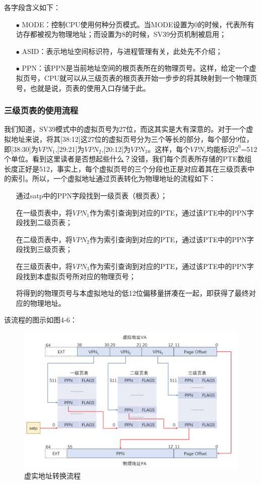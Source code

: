 各字段含义如下：

\begin{itemize}
	\item [$\bullet$]
	MODE：控制CPU使用何种分页模式。当MODE设置为0的时候，代表所有访存都被视为物理地址；而设置为8的时候，SV39分页机制被启用；
	\item [$\bullet$]
	ASID：表示地址空间标识符，与进程管理有关，此处先不介绍；
	\item [$\bullet$]
	PPN：该PPN是当前地址空间的根页表所在的物理页号。这样，给定一个虚拟页号，CPU就可以从三级页表的根页表开始一步步的将其映射到一个物理页号，也就是说，页表的使用入口存储于此。
\end{itemize}

\subsubsection{三级页表的使用流程}

我们知道，SV39模式中的虚拟页号为27位，而这其实是大有深意的。对于一个虚拟地址来说，将其[38:12]这27位的虚拟页号分为三个等长的部分，每个部分9位，即[38:30]为$VPN_{1}$,[29:21]为$VPN_{2}$,[20:12]为$VPN_{3}$。这样，每个$VPN_{i}$均能标识$2^{9}$=512个单位。看到这里读者是否想起些什么？没错，我们每个页表所存储的PTE数组长度正好是512，事实上，每个虚拟页号的三个分段也正是对应着其在三级页表中的索引。所以，一个虚拟地址通过页表转化为物理地址的流程如下：

\begin{itemize}
	\item [\ding{192}]
	通过satp中的PPN字段找到一级页表（根页表）；
	\item [\ding{193}]
	在一级页表中，将$VPN_{1}$作为索引查询到对应的PTE，通过该PTE中的PPN字段找到二级页表；
	\item [\ding{194}]
	在二级页表中，将$VPN_{2}$作为索引查询到对应的PTE，通过该PTE中的PPN字段找到三级页表；
	\item [\ding{195}]
	在三级页表中，将$VPN_{3}$作为索引查询到对应的PTE，通过该PTE中的PPN字段找到本虚拟页号所对应的物理页号；
	\item [\ding{196}]
	将得到的物理页号与本虚拟地址的低12位偏移量拼凑在一起，即获得了最终对应的物理地址。
\end{itemize}

该流程的图示如图4-6：

\begin{figure}[h]
	\centering
	\includegraphics[width=.80\textwidth]{figures/04-01-虚实地址转换流程.png}
	\caption{虚实地址转换流程}
\end{figure}\FloatBarrier

